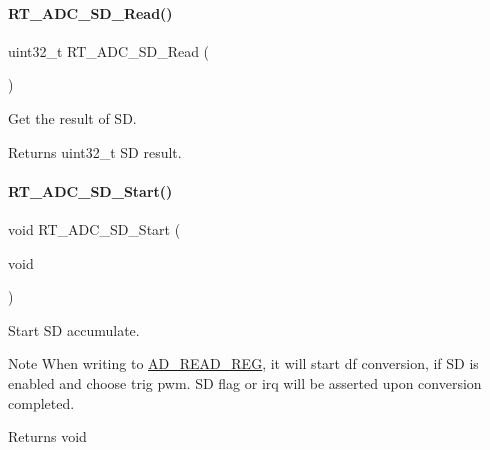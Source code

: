 \paragraph{\texorpdfstring{R\+T\+\_\+\+A\+D\+C\+\_\+\+S\+D\+\_\+\+Read()}{RT\_ADC\_SD\_Read()}}
{\footnotesize\ttfamily uint32\+\_\+t R\+T\+\_\+\+A\+D\+C\+\_\+\+S\+D\+\_\+\+Read (\begin{DoxyParamCaption}{ }\end{DoxyParamCaption})}



Get the result of SD. 

\begin{DoxyReturn}{Returns}
uint32\+\_\+t SD result. 
\end{DoxyReturn}
\mbox{\label{a00002_ac75cab97ce7cce47671dd8ef34e920d8}} 
\paragraph{\texorpdfstring{R\+T\+\_\+\+A\+D\+C\+\_\+\+S\+D\+\_\+\+Start()}{RT\_ADC\_SD\_Start()}}
{\footnotesize\ttfamily void R\+T\+\_\+\+A\+D\+C\+\_\+\+S\+D\+\_\+\+Start (\begin{DoxyParamCaption}\item[{void}]{ }\end{DoxyParamCaption})}



Start SD accumulate. 

\begin{DoxyNote}{Note}
When writing to \mbox{\hyperlink{a00020_adadaa0ab1ebbd7ba9b70dfd24c3ed44dacb460996f05b78aea23f3fa2722cc548}{A\+D\+\_\+\+R\+E\+A\+D\+\_\+\+R\+EG}}, it will start df conversion, if SD is enabled and choose trig pwm. SD flag or irq will be asserted upon conversion completed. 
\end{DoxyNote}
\begin{DoxyReturn}{Returns}
void 
\end{DoxyReturn}
\mbox{\label{a00002_a99cb1f9dcaee38a9ce2bd5e9eca49f33}} 
